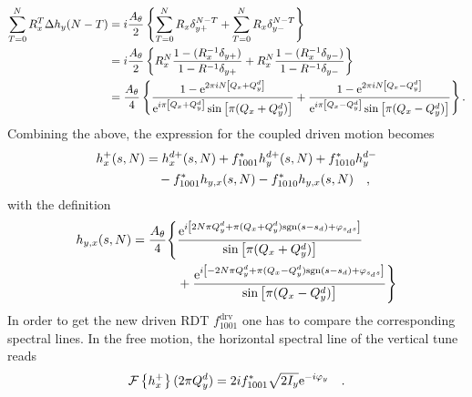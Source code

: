 \begin{align}
    \sum\limits_{T=0}^N R_x^T \Delta h_y(N-T)
        &=
        i\frac{A_\theta}{2} \left\{
            \sum\limits_{T=0}^N R_x \delta_{y+}^{N-T}
            +\sum\limits_{T=0}^N R_x \delta_{y-}^{N-T}
        \right\}
        \notag \\
        &=
        i\frac{A_\theta}{2} \left\{
            R_x^N\frac{1-(R_x^{-1}\delta_{y+})}{1-R^{-1}\delta_{y+}}
            +R_x^N\frac{1-(R_x^{-1}\delta_{y-})}{1-R^{-1}\delta_{y-}}
        \right\}
        \notag \\
        &=
        \frac{A_\theta}{4} \left\{
            \frac{1-\text{e}^{2\pi i N\left[ Q_x + Q_y^d \right]}}{\text{e}^{i\pi \left[Q_x+Q_y^d\right]}\sin\left[\pi (Q_x+Q_y^d)\right]}
            +\frac{1-\text{e}^{2\pi i N\left[ Q_x - Q_y^d \right]}}{\text{e}^{i\pi \left[Q_x-Q_y^d\right] }\sin\left[\pi (Q_x-Q_y^d)\right]}
        \right\}
        .
\end{align}
%
Combining the above, the expression for the coupled driven motion becomes
%
\begin{align}
    h_x^+(s,N)&=
    h_x^{d+}(s,N) + f^{*}_{1001}  h_y^{d+}(s,N) + f^{*}_{1010} h_y^{d-} \notag \\
    &\quad
    -f^*_{1001} h_{y,x}(s,N)
    -f^*_{1010} h_{y,x}(s,N)
    \quad ,
\end{align}
with the definition
%
\begin{align}
    h_{y,x}(s,N) = 
        \frac{A_\theta}{4} \Bigg\{&
             \frac{\text{e}^{i \left[2N \pi Q_y^d + \pi( Q_x + Q_y^d )\text{sgn}(s-s_d) + \varphi_{s_ds}\right]}}
                {\sin\left[\pi (Q_x+Q_y^d)\right]}
                \notag \\  &
            +\frac{\text{e}^{i \left[-2N\pi Q_y^d + \pi( Q_x - Q_y^d )\text{sgn}(s-s_d)+ \varphi_{s_ds}\right]}}
                {\sin\left[\pi (Q_x-Q_y^d)\right]}
        \Bigg\} \notag \\
\end{align}
%
%
In order to get the new driven RDT $f_{1001}^\text{drv}$ one has to compare the corresponding
spectral lines.
In the free motion, the horizontal spectral line of the vertical tune reads
%
\begin{equation}
    \mathcal{F} \left\{ h_x^+ \right\}(2\pi Q_y^d) = 2i f_{1001}^*\sqrt{2I_y}\text{e}^{-i\varphi_y}
    \quad .
\end{equation}
